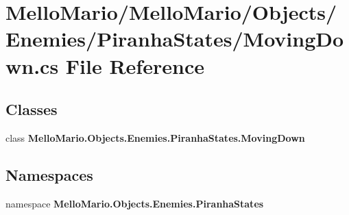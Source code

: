 \section{Mello\+Mario/\+Mello\+Mario/\+Objects/\+Enemies/\+Piranha\+States/\+Moving\+Down.cs File Reference}
\label{MovingDown_8cs}
\subsection*{Classes}
\begin{DoxyCompactItemize}
\item 
class \textbf{ Mello\+Mario.\+Objects.\+Enemies.\+Piranha\+States.\+Moving\+Down}
\end{DoxyCompactItemize}
\subsection*{Namespaces}
\begin{DoxyCompactItemize}
\item 
namespace \textbf{ Mello\+Mario.\+Objects.\+Enemies.\+Piranha\+States}
\end{DoxyCompactItemize}
